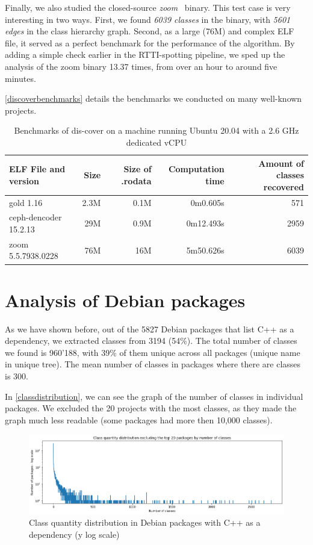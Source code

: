 \documentclass[a4paper,11pt,oneside]{report}
\begin{document}
Finally, we also studied the closed-source \emph{zoom}~\cite{zoom} binary.
This test case is very interesting in two ways.
First, we found \emph{6039 classes} in the binary, with \emph{5601 edges}
in the class hierarchy graph.
Second, as a large (76M) and complex ELF file, it served as a perfect benchmark 
for the performance of the algorithm.
By adding a simple check earlier in the RTTI-spotting pipeline, we sped up the
analysis of the zoom binary 13.37 times, from over an hour to around five
minutes.

\autoref{discoverbenchmarks} details the benchmarks we conducted on many 
well-known projects.

\begin{table}[h]
  \centering
  {\small
  \begin{tabular}{l | r | r | r | r }
    ELF File and version & Size & Size of .rodata & Computation time & Amount 
of classes recovered  \\
    \hline
    gold 1.16 & 2.3M & 0.1M & 0m0.605s & 571 \\
    ceph-dencoder 15.2.13 & 29M & 0.9M & 0m12.493s & 2959 \\
    zoom 5.5.7938.0228 & 76M & 16M & 5m50.626s & 6039 
  \end{tabular}
  }

\caption{Benchmarks of dis-cover on a machine running Ubuntu 20.04 with a 2.6 
GHz dedicated vCPU}
\label{discoverbenchmarks}

\end{table}


\section{Analysis of Debian packages}
\label{debiansection}

As we have shown before, out of the 5827 Debian packages that list C++ as a 
dependency, we extracted classes from 3194 (54\%).
The total number of classes we found is 960'188, with 39\% of them unique 
across all packages (unique name in unique tree).
The mean number of classes in packages where there are classes is 300.

In \autoref{classdistribution}, we can see the graph of the number of classes
in individual packages. We excluded the 20 projects with the most classes, as
they made the graph much less readable (some packages had more then 10,000
classes).

\begin{figure}

\includegraphics[width=16cm]{package_distribution.png}
\caption{Class quantity distribution in Debian packages with C++ as a
dependency (y log scale)}
\label{classdistribution}

\end{figure}
\end{document}
